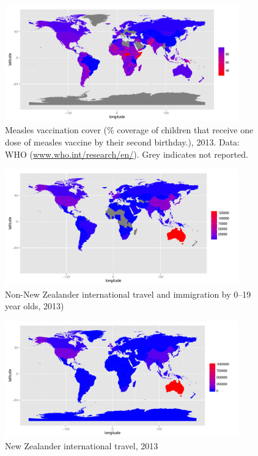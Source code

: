 \documentclass{article}
\begin{document}
\begin{figure}
\begin{center}
     \includegraphics[width=0.9\textwidth]{2013totnp3.pdf}
\end{center}
\caption{Measles vaccination cover (\% coverage of children that receive one dose of measles vaccine by their second birthday.), 2013. Data: WHO (\href{http://www.who.int/research/en/}{www.who.int/research/en/}). Grey indicates not reported.}
\label{fig:cover12}
\end{figure}

\begin{figure}
\begin{center}
     \includegraphics[width=0.9\textwidth]{2013np1.pdf}
\end{center}
\caption{Non-New Zealander international travel and immigration by 0--19 year olds, 2013)}
\label{fig:immigration12}
\end{figure}

\begin{figure}
\begin{center}
     \includegraphics[width=0.9\textwidth]{2013nznp1.pdf}
\end{center}
\caption{New Zealander international travel, 2013}
\label{fig:nztravel12}
\end{figure}
\end{document}
